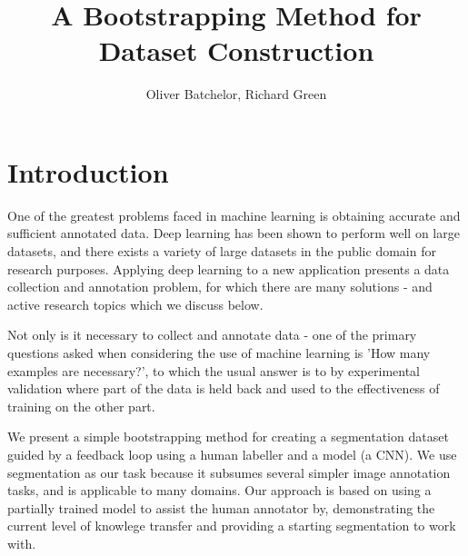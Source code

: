 \documentclass{article}
\begin{document}
\title{A Bootstrapping Method for Dataset Construction}


\author{Oliver Batchelor, Richard Green}

\maketitle


\printglossaries
{}



\begin{abstract}
 
\end{abstract} 
 


\section {Introduction}



One of the greatest problems faced in machine learning is obtaining accurate and sufficient annotated data. Deep learning has been shown to perform well on large datasets, and there exists a variety of large datasets in the public domain for research purposes. Applying deep learning to a new application presents a data collection and annotation problem, for which there are many solutions - and active research topics which we discuss below.

Not only is it necessary to collect and annotate data - one of the primary questions asked when considering the use of machine learning is 'How many examples are necessary?', to which the usual answer is to by experimental validation where part of the data is held back and used to the effectiveness of training on the other part.

We present a simple bootstrapping method for creating a segmentation dataset guided by a feedback loop using a human labeller and a model (a \gls{CNN}). We use segmentation as our task because it subsumes several simpler image annotation tasks, and is applicable to many domains. Our approach is based on using a partially trained model to assist the human annotator by, demonstrating the current level of knowlege transfer and providing a starting segmentation to work with.
\end{document}

